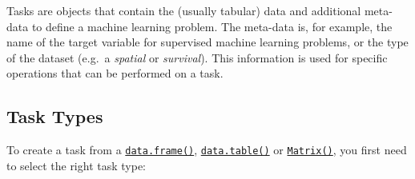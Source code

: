 \documentclass[
]{scrbook}
\begin{document}
Tasks are objects that contain the (usually tabular) data and additional meta-data to define a machine learning problem.
The meta-data is, for example, the name of the target variable for supervised machine learning problems, or the type of the dataset (e.g.~a \emph{spatial} or \emph{survival}).
This information is used for specific operations that can be performed on a task.

\hypertarget{tasks-types}{%
\subsection{Task Types}\label{tasks-types}}

To create a task from a \href{https://www.rdocumentation.org/packages/base/topics/data.frame}{\texttt{data.frame()}}, \href{https://www.rdocumentation.org/packages/data.table/topics/data.table-package}{\texttt{data.table()}} or \href{https://www.rdocumentation.org/packages/Matrix/topics/Matrix}{\texttt{Matrix()}}, you first need to select the right task type:
\end{document}
